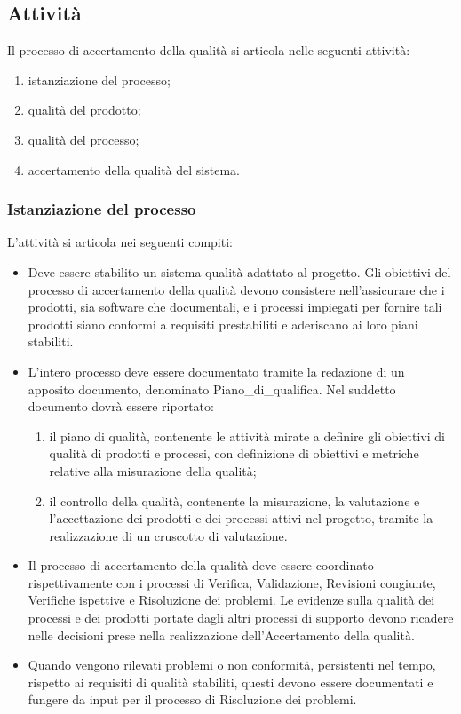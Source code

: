 \subsection{Attività}
Il processo di accertamento della qualità si articola nelle seguenti attività:
\begin{enumerate}
    \item istanziazione del processo;
    \item qualità del prodotto;
    \item qualità del processo;
    \item accertamento della qualità del sistema.
\end{enumerate}
\subsubsection{Istanziazione del processo}
L'attività si articola nei seguenti compiti:
\begin{itemize}
    \item Deve essere stabilito un sistema qualità adattato al progetto. Gli obiettivi del processo di accertamento della qualità devono consistere nell'assicurare che i prodotti, sia software che documentali, e i processi impiegati per fornire tali prodotti siano conformi a requisiti prestabiliti e aderiscano ai loro piani stabiliti.
    \item L'intero processo deve essere documentato tramite la redazione di un apposito documento, denominato Piano\_di\_qualifica. Nel suddetto documento dovrà essere riportato:
    \begin{enumerate}
        \item il piano di qualità, contenente le attività mirate a definire gli obiettivi di qualità di prodotti e processi, con definizione di obiettivi e metriche relative alla misurazione della qualità;
        \item il controllo della qualità, contenente la misurazione, la valutazione e l'accettazione dei prodotti e dei processi attivi nel progetto, tramite la realizzazione di un cruscotto di valutazione.
    \end{enumerate}
    
    \item Il processo di accertamento della qualità deve essere coordinato rispettivamente con i processi di Verifica, Validazione, Revisioni congiunte, Verifiche ispettive e Risoluzione dei problemi. Le evidenze sulla qualità dei processi e dei prodotti portate dagli altri processi di supporto devono ricadere nelle decisioni prese nella realizzazione dell'Accertamento della qualità.
    \item Quando vengono rilevati problemi o non conformità, persistenti nel tempo, rispetto ai requisiti di qualità stabiliti, questi devono essere documentati e fungere da input per il processo di Risoluzione dei problemi.
\end{itemize}


